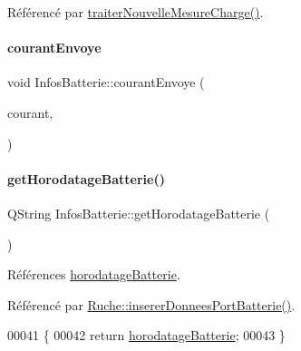 Référencé par \hyperlink{class_infos_batterie_a92c1afb1e022fe75cd7a0877d64e8d53}{traiter\+Nouvelle\+Mesure\+Charge()}.

\mbox{\label{class_infos_batterie_a3b648bf48c796c64d90db29741889eb1}} 
\paragraph{\texorpdfstring{courant\+Envoye}{courantEnvoye}}
{\footnotesize\ttfamily void Infos\+Batterie\+::courant\+Envoye (\begin{DoxyParamCaption}\item[{const double}]{courant,  }\item[{Q\+String}]{ }\end{DoxyParamCaption})\hspace{0.3cm}{\ttfamily [signal]}}

\mbox{\label{class_infos_batterie_aeac9a7bcd953444f4f2302d7949c74ef}} 
\paragraph{\texorpdfstring{get\+Horodatage\+Batterie()}{getHorodatageBatterie()}}
{\footnotesize\ttfamily Q\+String Infos\+Batterie\+::get\+Horodatage\+Batterie (\begin{DoxyParamCaption}{ }\end{DoxyParamCaption})}



Références \hyperlink{class_infos_batterie_a261067aff87023bccd60e59961ef1ffc}{horodatage\+Batterie}.



Référencé par \hyperlink{class_ruche_a509367d6b2bcb7e6431fc1cc5ff606b5}{Ruche\+::inserer\+Donnees\+Port\+Batterie()}.


\begin{DoxyCode}
00041 \{
00042     \textcolor{keywordflow}{return} \hyperlink{class_infos_batterie_a261067aff87023bccd60e59961ef1ffc}{horodatageBatterie};
00043 \}
\end{DoxyCode}
\mbox{\label{class_infos_batterie_a8c37174d0d36e4f5ada9d16dd5894803}} 

